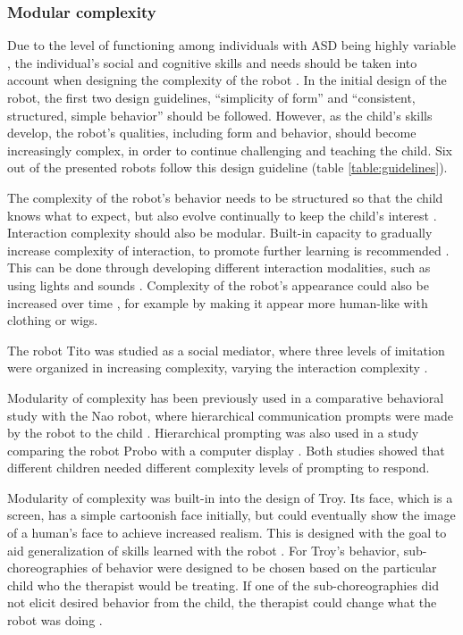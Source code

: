 \subsubsection{Modular complexity}

Due to the level of functioning among individuals with ASD being highly variable \cite{WHOautism}, the individual's social and cognitive skills and needs should be taken into account when designing the complexity of the robot \cite{bonvillian1981sign, designSpaces, tetzchner}. In the initial design of the robot, the first two design guidelines, ``simplicity of form'' and ``consistent, structured, simple behavior'' should be followed. However, as the child's skills develop, the robot's qualities, including form and behavior, should become increasingly complex, in order to continue challenging and teaching the child. Six out of the presented robots follow this design guideline (table \ref{table:guidelines}).

The complexity of the robot's behavior needs to be structured so that the child knows what to expect, but also evolve continually to keep the child's interest \cite{designSpaces, michaud2003characteristics}. Interaction complexity should also be modular. Built-in capacity to gradually increase complexity of interaction, to promote further learning is recommended \cite{designSpaces, robins2007eliciting}. This can be done through developing different interaction modalities, such as using lights and sounds \cite{robins2007eliciting}. Complexity of the robot's appearance could also be increased over time \cite{robins2007eliciting}, for example by making it appear more human-like with clothing or wigs.

The robot Tito was studied as a social mediator, where three levels of imitation were organized in increasing complexity, varying the interaction complexity \cite{duquette2008exploring}.

Modularity of complexity has been previously used in a comparative behavioral study with the Nao robot, where hierarchical communication prompts were made by the robot to the child \cite{ARIA}. Hierarchical prompting was also used in a study comparing the robot Probo with a computer display \cite{pop2013social}. Both studies showed that different children needed different complexity levels of prompting to respond. 

Modularity of complexity was built-in into the design of Troy. Its face, which is a screen, has a simple cartoonish face initially, but could eventually show the image of a human's face to achieve increased realism. This is designed with the goal to aid generalization of skills learned with the robot \cite{giullian2010detailed}. For Troy's behavior, sub-choreographies of behavior were designed to be chosen based on the particular child who the therapist would be treating. If one of the sub-choreographies did not elicit desired behavior from the child, the therapist could change what the robot was doing \cite{giullian2010detailed}.

